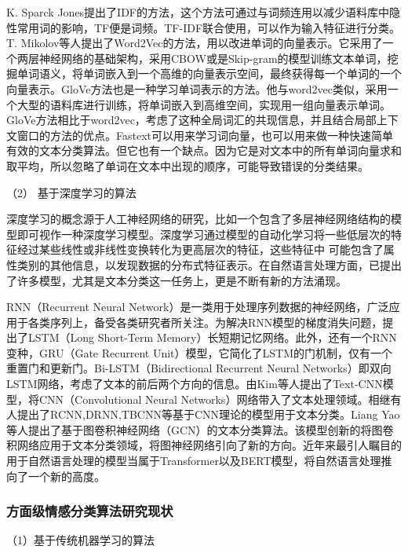 K. Sparck Jones提出了IDF的方法，这个方法可通过与词频连用以减少语料库中隐性常用词的影响，TF便是词频。TF-IDF联合使用，可以作为输入特征进行分类。T. Mikolov等人提出了Word2Vec的方法，用以改进单词的向量表示。它采用了一个两层神经网络的基础架构，采用CBOW或是Skip-gram的模型训练文本单词，挖掘单词语义，将单词嵌入到一个高维的向量表示空间，最终获得每一个单词的一个向量表示。GloVe方法也是一种学习单词表示的方法。他与word2vec类似，采用一个大型的语料库进行训练，将单词嵌入到高维空间，实现用一组向量表示单词。GloVe方法相比于word2vec，考虑了这种全局词汇的共现信息，并且结合局部上下文窗口的方法的优点。Fastext可以用来学习词向量，也可以用来做一种快速简单有效的文本分类算法。但它也有一个缺点。因为它是对文本中的所有单词向量求和取平均，所以忽略了单词在文本中出现的顺序，可能导致错误的分类结果。

（2） 基于深度学习的算法

深度学习的概念源于人工神经网络的研究，比如一个包含了多层神经网络结构的模型即可视作一种深度学习模型。深度学习通过模型的自动化学习将一些低层次的特征经过某些线性或非线性变换转化为更高层次的特征，这些特征中
可能包含了属性类别的其他信息，以发现数据的分布式特征表示。在自然语言处理方面，已提出了许多模型，尤其是文本分类这一任务上，更是不断有新的方法涌现。

RNN（Recurrent Neural Network）是一类用于处理序列数据的神经网络，广泛应用于各类序列上，备受各类研究者所关注。为解决RNN模型的梯度消失问题，提出了LSTM（Long Short-Term Memory）长短期记忆网络。此外，还有一个RNN变种，GRU（Gate Recurrent Unit）模型，它简化了LSTM的门机制，仅有一个重置门和更新门。Bi-LSTM（Bidirectional Recurrent Neural Networks）即双向LSTM网络，考虑了文本的前后两个方向的信息。由Kim等人提出了Text-CNN模型，将CNN（Convolutional Neural Networks）网络带入了文本处理领域。相继有人提出了RCNN,DRNN,TBCNN等基于CNN理论的模型用于文本分类。Liang Yao等人提出了基于图卷积神经网络（GCN）的文本分类算法。该模型创新的将图卷积网络应用于文本分类领域，将图神经网络引向了新的方向。近年来最引人瞩目的用于自然语言处理的模型当属于Transformer以及BERT模型，将自然语言处理推向了一个新的高度。

\subsubsection{方面级情感分类算法研究现状}
（1）基于传统机器学习的算法

